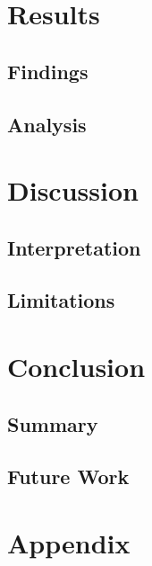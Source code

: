 \documentclass[12pt]{report}
\begin{document}
\chapter{Results}

\section{Findings}

\section{Analysis}

\chapter{Discussion}

\section{Interpretation}

\section{Limitations}

\chapter{Conclusion}

\section{Summary}

\section{Future Work}




\appendix

\chapter{Appendix}
\end{document}
